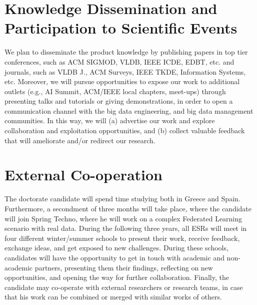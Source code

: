 \documentclass[12pt]{article}
\begin{document}
\section{Knowledge Dissemination and Participation to Scientific Events}

We plan to disseminate the product knowledge by publishing papers in top tier conferences, such as ACM
SIGMOD, VLDB, IEEE ICDE, EDBT, etc. and journals, such as VLDB J., ACM Surveys, IEEE TKDE,
Information Systems, etc. Moreover, we will pursue opportunities to expose our work to additional
outlets (e.g., AI Summit, ACM/IEEE local chapters, meet-ups) through presenting talks and tutorials or
giving demonstrations, in order to open a communication channel with the big data engineering,
and big data management communities. In this way, we will (a) advertise our work and explore collaboration
and exploitation opportunities, and (b) collect valuable feedback that will ameliorate and/or redirect our
research.



\section{External Co-operation}
The doctorate candidate will spend time studying both in Greece 
and Spain. Furthermore, a secondment of three months will take place, where the candidate will join
Spring Techno, where he will work on a complex Federated Learning scenario with real data.
During the following three years, all ESRs will meet in four different winter/summer schools to present their work, receive feedback, exchange ideas, and get exposed to new challenges. During these schools, candidates will have the opportunity to get in touch with academic and non-academic partners, presenting them their findings, reflecting on new opportunities, and opening the way for further collaboration. Finally, the candidate may co-operate with external researchers or research teams, in case that his work can be combined or merged with similar works of others.
\end{document}
